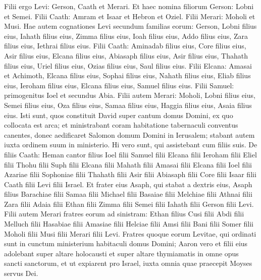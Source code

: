 \begin{biblechapter}  
\verse Filii ergo Levi: Gerson, Caath et Merari. 
\verse Et haec nomina filiorum Gerson: Lobni et Semei. 
\verse Filii Caath: Amram et Isaar et Hebron et Oziel.  
\verse Filii Merari: Moholi et Musi. Hae autem cognationes Levi secundum familias eorum: 
\verse Gerson, Lobni filius eius, Iahath filius eius, Zimma filius eius, 
\verse Ioah filius eius, Addo filius eius, Zara filius eius, Iethrai filius eius. 
\verse Filii Caath: Aminadab filius eius, Core filius eius, Asir filius eius, 
\verse Elcana filius eius, Abiasaph filius eius, Asir filius eius, 
\verse Thahath filius eius, Uriel filius eius, Ozias filius eius, Saul filius eius. 
\verse Filii Elcana: Amasai et Achimoth,  
\verse Elcana filius eius, Sophai filius eius, Nahath filius eius, 
\verse Eliab filius eius, Ieroham filius eius, Elcana filius eius, Samuel filius eius. 
\verse Filii Samuel: primogenitus Ioel et secundus Abia. 
\verse Filii autem Merari: Moholi, Lobni filius eius, Semei filius eius, Oza filius eius, 
\verse Samaa filius eius, Haggia filius eius, Asaia filius eius. 
\verse Isti sunt, quos constituit David super cantum domus Domini, ex quo collocata est arca; 
\verse et ministrabant coram habitatione tabernaculi conventus canentes, donec aedificaret Salomon domum Domini in Ierusalem; stabant autem iuxta ordinem suum in ministerio. 
\verse Hi vero sunt, qui assistebant cum filiis suis. De filiis Caath: Heman cantor filius Ioel filii Samuel 
\verse filii Elcana filii Ieroham filii Eliel filii Thohu 
\verse filii Suph filii Elcana filii Mahath filii Amasai 
\verse filii Elcana filii Ioel filii Azariae filii Sophoniae 
\verse filii Thahath filii Asir filii Abiasaph filii Core 
\verse filii Isaar filii Caath filii Levi filii Israel. 
\verse Et frater eius Asaph, qui stabat a dextris eius, Asaph filius Barachiae filii Samaa 
\verse filii Michael filii Basaiae filii Melchiae 
\verse filii Athnai filii Zara filii Adaia 
\verse filii Ethan filii Zimma filii Semei 
\verse filii Iahath filii Gerson filii Levi. 
\verse Filii autem Merari fratres eorum ad sinistram: Ethan filius Cusi filii Abdi filii Melluch 
\verse filii Hasabiae filii Amasiae filii Helciae 
\verse filii Amsi filii Bani filii Somer 
\verse filii Moholi filii Musi filii Merari filii Levi. 
\verse Fratres quoque eorum Levitae, qui ordinati sunt in cunctum ministerium habitaculi domus Domini; 
\verse Aaron vero et filii eius adolebant super altare holocausti et super altare thymiamatis in omne opus sancti sanctorum, et ut expiarent pro Israel, iuxta omnia quae praecepit Moyses servus Dei. 

\end{biblechapter}

